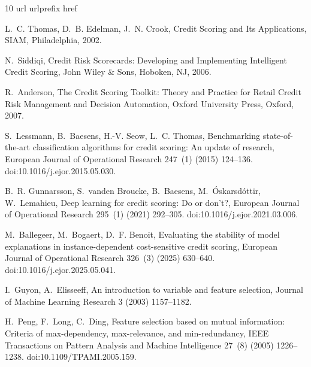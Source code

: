 \documentclass[preprint,12pt]{elsarticle}
\begin{document}
\begin{thebibliography}{10}
\expandafter\ifx\csname url\endcsname\relax
  \def\url#1{\texttt{#1}}\fi
\expandafter\ifx\csname urlprefix\endcsname\relax\def\urlprefix{URL }\fi
\expandafter\ifx\csname href\endcsname\relax
  \def\href#1#2{#2} \def\path#1{#1}\fi

L.~C. Thomas, D.~B. Edelman, J.~N. Crook, Credit Scoring and Its Applications,
  SIAM, Philadelphia, 2002.

N.~Siddiqi, Credit Risk Scorecards: Developing and Implementing Intelligent
  Credit Scoring, John Wiley \& Sons, Hoboken, NJ, 2006.

R.~Anderson, The Credit Scoring Toolkit: Theory and Practice for Retail Credit
  Risk Management and Decision Automation, Oxford University Press, Oxford,
  2007.

S.~Lessmann, B.~Baesens, H.-V. Seow, L.~C. Thomas, Benchmarking
  state-of-the-art classification algorithms for credit scoring: An update of
  research, European Journal of Operational Research 247~(1) (2015) 124--136.
\newblock \href {https://doi.org/10.1016/j.ejor.2015.05.030}
  {\path{doi:10.1016/j.ejor.2015.05.030}}.

B.~R. Gunnarsson, S.~vanden Broucke, B.~Baesens, M.~{\'O}skarsd{\'o}ttir,
  W.~Lemahieu, Deep learning for credit scoring: Do or don't?, European Journal
  of Operational Research 295~(1) (2021) 292--305.
\newblock \href {https://doi.org/10.1016/j.ejor.2021.03.006}
  {\path{doi:10.1016/j.ejor.2021.03.006}}.

M.~Ballegeer, M.~Bogaert, D.~F. Benoit, Evaluating the stability of model
  explanations in instance-dependent cost-sensitive credit scoring, European
  Journal of Operational Research 326~(3) (2025) 630--640.
\newblock \href {https://doi.org/10.1016/j.ejor.2025.05.041}
  {\path{doi:10.1016/j.ejor.2025.05.041}}.

I.~Guyon, A.~Elisseeff, An introduction to variable and feature selection,
  Journal of Machine Learning Research 3 (2003) 1157--1182.

H.~Peng, F.~Long, C.~Ding, Feature selection based on mutual information:
  Criteria of max-dependency, max-relevance, and min-redundancy, IEEE
  Transactions on Pattern Analysis and Machine Intelligence 27~(8) (2005)
  1226--1238.
\newblock \href {https://doi.org/10.1109/TPAMI.2005.159}
  {\path{doi:10.1109/TPAMI.2005.159}}.


\end{thebibliography}
\end{document}
